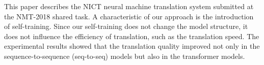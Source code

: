 This paper describes the NICT neural machine translation system submitted at the NMT-2018 shared task.  A characteristic of our approach is the introduction of self-training.  Since our self-training does not change the model structure, it does not influence the efficiency of translation, such as the translation speed. The experimental results showed that the translation quality improved not only in the sequence-to-sequence (seq-to-seq) models but also in the transformer models.
